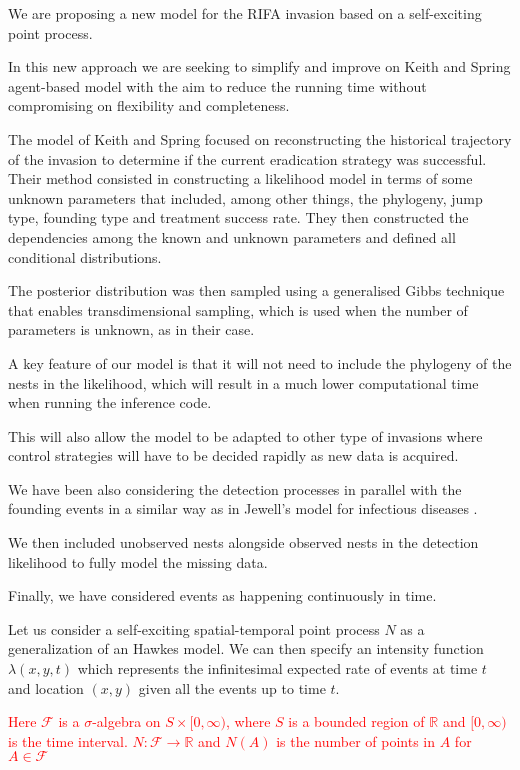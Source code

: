\documentclass[11pt,a4paper]{article}
\begin{document}
We are proposing a new model for the RIFA invasion based on a self-exciting point process.

In this new approach we are seeking to simplify and improve on Keith and Spring agent-based model \cite{Keith} with the aim to reduce the running time without compromising on flexibility and completeness.

The model of Keith and Spring focused on reconstructing the historical trajectory of the invasion to determine if the current eradication strategy was successful. Their method consisted in constructing a likelihood model in terms of some unknown parameters that included, among other things, the phylogeny, jump type, founding type and treatment success rate. They then constructed the dependencies among the known and unknown parameters and defined all conditional distributions.

The posterior distribution was then sampled using a generalised Gibbs technique that enables transdimensional sampling, which is used when the number of parameters is unknown, as in their case.

A key feature of our model is that it will not need to include the phylogeny of the nests in the likelihood, which will result in a much lower computational time when running the inference code.

This will also allow the model to be adapted to other type of invasions where control strategies will have to be decided rapidly as new data is acquired.

We have been also considering the detection processes in parallel with the founding events in a similar way as in Jewell's model for infectious diseases \cite{Jewell}.

We then included unobserved nests alongside observed nests in the detection likelihood to fully model the missing data.

Finally, we have considered events as happening continuously in time.

Let us consider a self-exciting spatial-temporal point process $N$ as a generalization of an Hawkes model. We can then specify an intensity function $\lambda(x, y, t)$ which represents the infinitesimal expected  rate of events at time $t$ and location $(x, y)$  given all the events up to time $t$.

\textcolor{red}{Here $\mathcal{F}$ is a $\sigma$-algebra on $S \times [0, \infty )$, where $S$ is a bounded region of $\mathbb{R}$ and $[0, \infty)$ is the time interval. $N: \mathcal{F} \to \mathbb{R}$ and $N(A)$ is the number of points in $A$ for $A \in \mathcal{F}$}
\end{document}
